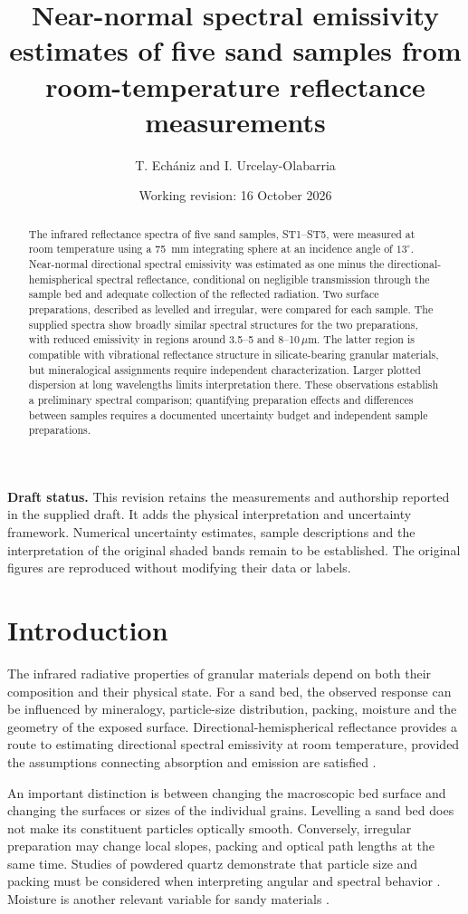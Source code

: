 \documentclass[11pt,a4paper]{article}
\title{Near-normal spectral emissivity estimates of five sand samples from room-temperature reflectance measurements}
\author{T. Ech\'aniz and I. Urcelay-Olabarria}
\date{Working revision: 16 October 2026}
\newcommand{\um}{\ensuremath{\,\mu\mathrm{m}}}
\begin{document}
\maketitle
\noindent\textbf{Draft status.} This revision retains the measurements and authorship reported in the supplied draft. It adds the physical interpretation and uncertainty framework. Numerical uncertainty estimates, sample descriptions and the interpretation of the original shaded bands remain to be established. The original figures are reproduced without modifying their data or labels.

\begin{abstract}
The infrared reflectance spectra of five sand samples, ST1--ST5, were measured at room temperature using a 75~mm integrating sphere at an incidence angle of $13^\circ$. Near-normal directional spectral emissivity was estimated as one minus the directional-hemispherical spectral reflectance, conditional on negligible transmission through the sample bed and adequate collection of the reflected radiation. Two surface preparations, described as levelled and irregular, were compared for each sample. The supplied spectra show broadly similar spectral structures for the two preparations, with reduced emissivity in regions around 3.5--5 and 8--10\um. The latter region is compatible with vibrational reflectance structure in silicate-bearing granular materials, but mineralogical assignments require independent characterization. Larger plotted dispersion at long wavelengths limits interpretation there. These observations establish a preliminary spectral comparison; quantifying preparation effects and differences between samples requires a documented uncertainty budget and independent sample preparations.
\end{abstract}

\section{Introduction}
The infrared radiative properties of granular materials depend on both their composition and their physical state. For a sand bed, the observed response can be influenced by mineralogy, particle-size distribution, packing, moisture and the geometry of the exposed surface. Directional-hemispherical reflectance provides a route to estimating directional spectral emissivity at room temperature, provided the assumptions connecting absorption and emission are satisfied \cite{salisbury1992,salisbury1994}.

An important distinction is between changing the macroscopic bed surface and changing the surfaces or sizes of the individual grains. Levelling a sand bed does not make its constituent particles optically smooth. Conversely, irregular preparation may change local slopes, packing and optical path lengths at the same time. Studies of powdered quartz demonstrate that particle size and packing must be considered when interpreting angular and spectral behavior \cite{wald1995}. Moisture is another relevant variable for sandy materials \cite{mira2007}.
\end{document}
